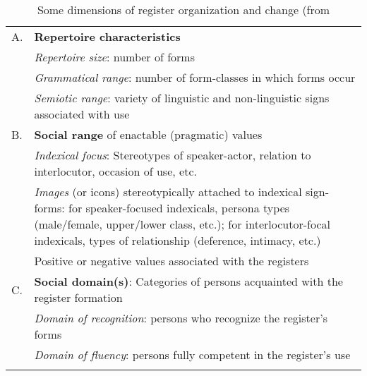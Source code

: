 \begin{table}
\begin{tabularx}{\textwidth}{R{1cm}X}
\lsptoprule
A.  & \textbf{Repertoire characteristics} \\
&
  \textit{Repertoire size}: number of forms
\\
&
  \textit{Grammatical range}: number of form-classes in which forms occur
\\
&
  \textit{Semiotic range}: variety of linguistic and non-linguistic signs associated with use
\\
 B. & \textbf{Social range} of enactable (pragmatic) values\\
&
  \textit{Indexical focus}: Stereotypes of speaker-actor, relation to interlocutor, occasion of use, etc.
\\
&
  \textit{Images} (or icons) stereotypically attached to indexical sign-forms: for speaker-focused indexicals, persona types (male/female, upper/lower class, etc.); for interlocutor-focal indexicals, types of relationship (deference, intimacy, etc.)
\\
&
  Positive or negative values associated with the registers
\\
 C. & \textbf{Social domain(s)}: Categories of persons acquainted with the register formation\\
&
  \textit{Domain of recognition}: persons who recognize the register’s forms
\\
&
  \textit{Domain of fluency}: persons fully competent in the register’s use
\\
\lspbottomrule
\end{tabularx}
\caption{Some dimensions of register organization and change (from \citealt[169]{Agha2007}}
\label{tab:2:3}
\end{table}

